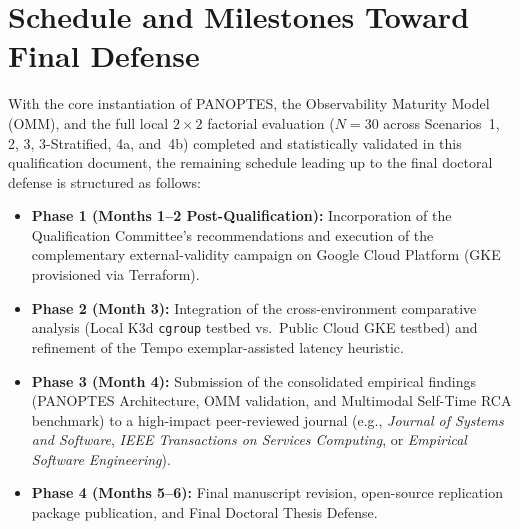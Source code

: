 \section{Schedule and Milestones Toward Final Defense}
\label{sec:schedule-milestones}

With the core instantiation of PANOPTES, the Observability Maturity Model (OMM), and the full local $2\times2$ factorial evaluation ($N=30$ across Scenarios~1, 2, 3, 3-Stratified, 4a, and~4b) completed and statistically validated in this qualification document, the remaining schedule leading up to the final doctoral defense is structured as follows:

\begin{itemize}
    \item \textbf{Phase 1 (Months 1--2 Post-Qualification):} Incorporation of the Qualification Committee's recommendations and execution of the complementary external-validity campaign on Google Cloud Platform (GKE provisioned via Terraform).
    \item \textbf{Phase 2 (Month 3):} Integration of the cross-environment comparative analysis (Local K3d \texttt{cgroup} testbed vs.\ Public Cloud GKE testbed) and refinement of the Tempo exemplar-assisted latency heuristic.
    \item \textbf{Phase 3 (Month 4):} Submission of the consolidated empirical findings (PANOPTES Architecture, OMM validation, and Multimodal Self-Time RCA benchmark) to a high-impact peer-reviewed journal (e.g., \textit{Journal of Systems and Software}, \textit{IEEE Transactions on Services Computing}, or \textit{Empirical Software Engineering}).
    \item \textbf{Phase 4 (Months 5--6):} Final manuscript revision, open-source replication package publication, and Final Doctoral Thesis Defense.
\end{itemize}
